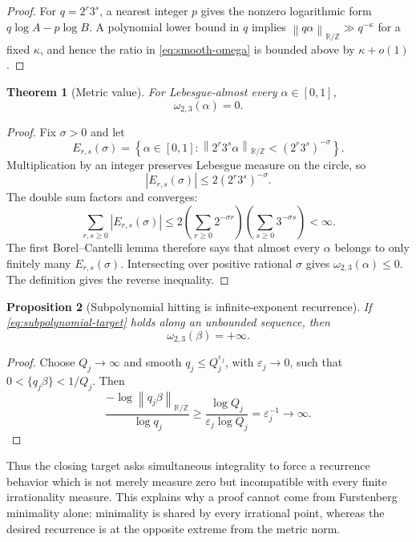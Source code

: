 \documentclass[11pt]{article}
\newtheorem{theorem}{Theorem}[section]
\newtheorem{proposition}[theorem]{Proposition}
\theoremstyle{definition}
\theoremstyle{remark}
\newcommand{\Z}{\mathbb Z}
\newcommand{\R}{\mathbb R}
\newcommand{\norm}[1]{\left\lVert#1\right\rVert}
\begin{document}
\begin{proof}
For $q=2^r3^s$, a nearest integer $p$ gives the nonzero logarithmic form
$q\log A-p\log B$.  A polynomial lower bound in $q$ implies
$\norm{q\alpha}_{\R/\Z}\gg q^{-\kappa}$ for a fixed $\kappa$, and hence the ratio
in \eqref{eq:smooth-omega} is bounded above by $\kappa+o(1)$.
\end{proof}

\begin{theorem}[Metric value]\label{thm:metric-omega}
For Lebesgue-almost every $\alpha\in[0,1]$,
\begin{equation}\label{eq:metric-omega-zero}
 \omega_{2,3}(\alpha)=0.
\end{equation}
\end{theorem}

\begin{proof}
Fix $\sigma>0$ and let
\[
 E_{r,s}(\sigma)=
 \left\{\alpha\in[0,1]:
 \norm{2^r3^s\alpha}_{\R/\Z}<(2^r3^s)^{-\sigma}
 \right\}.
\]
Multiplication by an integer preserves Lebesgue measure on the circle, so
\[
 |E_{r,s}(\sigma)|\le2(2^r3^s)^{-\sigma}.
\]
The double sum factors and converges:
\[
 \sum_{r,s\ge0}|E_{r,s}(\sigma)|
 \le2\left(\sum_{r\ge0}2^{-\sigma r}\right)
       \left(\sum_{s\ge0}3^{-\sigma s}\right)<\infty.
\]
The first Borel--Cantelli lemma therefore says that almost every $\alpha$ belongs to
only finitely many $E_{r,s}(\sigma)$.  Intersecting over positive rational $\sigma$
gives $\omega_{2,3}(\alpha)\le0$.  The definition gives the reverse inequality.
\end{proof}

\begin{proposition}[Subpolynomial hitting is infinite-exponent recurrence]
If \eqref{eq:subpolynomial-target} holds along an unbounded sequence, then
\begin{equation}\label{eq:omega-infinite}
 \omega_{2,3}(\beta)=+\infty.
\end{equation}
\end{proposition}

\begin{proof}
Choose $Q_j\to\infty$ and smooth $q_j\le Q_j^{\varepsilon_j}$, with
$\varepsilon_j\to0$, such that $0<\{q_j\beta\}<1/Q_j$.  Then
\[
 \frac{-\log\norm{q_j\beta}_{\R/\Z}}{\log q_j}
 \ge\frac{\log Q_j}{\varepsilon_j\log Q_j}
 =\varepsilon_j^{-1}\longrightarrow\infty.
\]
\end{proof}

Thus the closing target asks simultaneous integrality to force a recurrence behavior
which is not merely measure zero but incompatible with every finite irrationality
measure.  This explains why a proof cannot come from Furstenberg minimality alone:
minimality is shared by every irrational point, whereas the desired recurrence is at
the opposite extreme from the metric norm.
\end{document}
